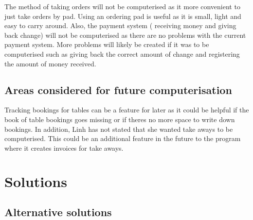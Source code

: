 The method of taking orders will not be computerised as it more convenient to just take orders by pad. Using an ordering pad is useful as it is small, light and easy to carry around. Also, the payment system ( receiving money and giving back change) will not be computerised as there are no problems with the current payment system. More problems will likely be created if it was to be computerised such as giving back the correct amount of change and registering the amount of money received.

\subsection{Areas considered for future computerisation}

Tracking bookings for tables can be a feature for later as it could be helpful if the book of table bookings goes missing or if theres no more space to write down bookings. In addition, Linh has not stated that she wanted take aways to be computerised. This could be an additional feature in the future to the program where it creates invoices for take aways.

\section{Solutions}

\subsection{Alternative solutions}

